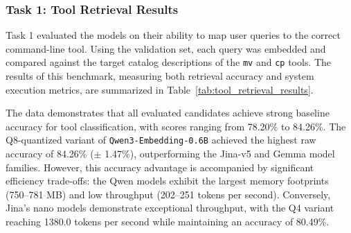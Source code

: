 \subsubsection{Task 1: Tool Retrieval Results}

Task 1 evaluated the models on their ability to map user queries to the correct command-line tool. Using the validation set, each query was embedded and compared against the target catalog descriptions of the \texttt{mv} and \texttt{cp} tools. The results of this benchmark, measuring both retrieval accuracy and system execution metrics, are summarized in Table~\ref{tab:tool_retrieval_results}.
\FloatBarrier
\begin{table}[htbp]
\centering
\caption{Task 1: Tool Retrieval Benchmark Results}
\label{tab:tool_retrieval_results}
\end{table}
\FloatBarrier

The data demonstrates that all evaluated candidates achieve strong baseline accuracy for tool classification, with scores ranging from 78.20\% to 84.26\%. The Q8-quantized variant of \texttt{Qwen3-Embedding-0.6B} achieved the highest raw accuracy of 84.26\% ($\pm$ 1.47\%), outperforming the Jina-v5 and Gemma model families. However, this accuracy advantage is accompanied by significant efficiency trade-offs: the Qwen models exhibit the largest memory footprints (750--781 MB) and low throughput (202--251 tokens per second). Conversely, Jina's nano models demonstrate exceptional throughput, with the Q4 variant reaching 1380.0 tokens per second while maintaining an accuracy of 80.49\%. 

